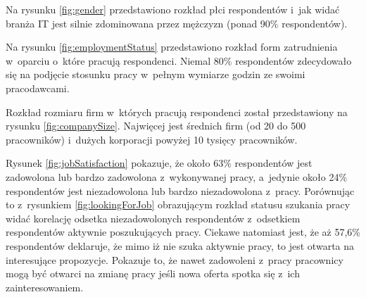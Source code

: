 
Na rysunku \ref{fig:gender} przedstawiono rozkład płci respondentów i~jak widać branża IT jest silnie zdominowana przez mężczyzn (ponad 90\% respondentów).



Na rysunku \ref{fig:employmentStatus} przedstawiono rozkład form zatrudnienia w~oparciu o~które pracują respondenci.
Niemal 80\% respondentów zdecydowało się na podjęcie stosunku pracy w~pełnym wymiarze godzin ze swoimi pracodawcami.



Rozkład rozmiaru firm w~których pracują respondenci został przedstawiony na rysunku \ref{fig:companySize}. Najwięcej jest średnich firm (od 20 do 500 pracowników) i~dużych korporacji powyżej 10 tysięcy pracowników.



Rysunek \ref{fig:jobSatisfaction} pokazuje, że około 63\% respondentów jest zadowolona lub bardzo zadowolona z~wykonywanej pracy, a~jedynie około 24\% respondentów jest niezadowolona lub bardzo niezadowolona z~pracy.
Porównując to z~rysunkiem \ref{fig:lookingForJob} obrazującym rozkład statusu szukania pracy widać korelację odsetka niezadowolonych respondentów z~odsetkiem respondentów aktywnie poszukujących pracy.
Ciekawe natomiast jest, że aż 57,6\% respondentów deklaruje, że mimo iż nie szuka aktywnie pracy, to jest otwarta na interesujące propozycje.
Pokazuje to, że nawet zadowoleni z~pracy pracownicy mogą być otwarci na zmianę pracy jeśli nowa oferta spotka się z~ich zainteresowaniem.


